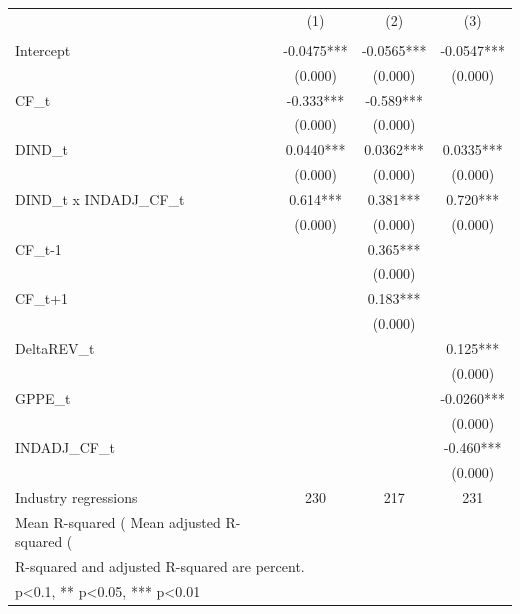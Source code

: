 {
\def\sym#1{\ifmmode^{#1}\else\(^{#1}\)\fi}
\begin{tabular}{l*{3}{c}}
\hline\hline
                    &\multicolumn{1}{c}{(1)}&\multicolumn{1}{c}{(2)}&\multicolumn{1}{c}{(3)}\\
                    &\multicolumn{1}{c}{}&\multicolumn{1}{c}{}&\multicolumn{1}{c}{}\\
\hline
Intercept           &     -0.0475***&     -0.0565***&     -0.0547***\\
                    &     (0.000)   &     (0.000)   &     (0.000)   \\
[1em]
CF\_t                &      -0.333***&      -0.589***&               \\
                    &     (0.000)   &     (0.000)   &               \\
[1em]
DIND\_t              &      0.0440***&      0.0362***&      0.0335***\\
                    &     (0.000)   &     (0.000)   &     (0.000)   \\
[1em]
DIND\_t x INDADJ\_CF\_t&       0.614***&       0.381***&       0.720***\\
                    &     (0.000)   &     (0.000)   &     (0.000)   \\
[1em]
CF\_{t-1}            &               &       0.365***&               \\
                    &               &     (0.000)   &               \\
[1em]
CF\_{t+1}            &               &       0.183***&               \\
                    &               &     (0.000)   &               \\
[1em]
DeltaREV\_t          &               &               &       0.125***\\
                    &               &               &     (0.000)   \\
[1em]
GPPE\_t              &               &               &     -0.0260***\\
                    &               &               &     (0.000)   \\
[1em]
INDADJ\_CF\_t         &               &               &      -0.460***\\
                    &               &               &     (0.000)   \\
\hline
Industry regressions&         230   &         217   &         231   \\
Mean R-squared (%
Mean adjusted R-squared (%
\hline\hline
\multicolumn{4}{l}{\footnotesize mean coefficients; p in parentheses}\\
\multicolumn{4}{l}{\footnotesize R-squared and adjusted R-squared are percent.}\\
\multicolumn{4}{l}{\footnotesize * p<0.1, ** p<0.05, *** p<0.01}\\
\end{tabular}
}
